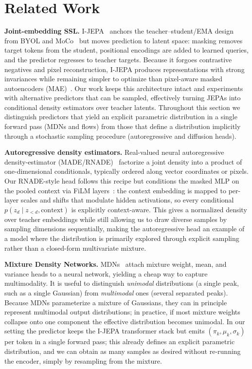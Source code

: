 \documentclass[conference]{IEEEtran}
\begin{document}
\section{Related Work}
\textbf{Joint-embedding SSL.}
I-JEPA~\cite{assran2023jepa} anchors the teacher--student/EMA design from BYOL and MoCo~\cite{grill2020byol,chen2020moco,chen2020momentum} but moves prediction to latent space: masking removes target tokens from the student, positional encodings are added to learned queries, and the predictor regresses to teacher targets.
Because it forgoes contrastive negatives and pixel reconstruction, I-JEPA produces representations with strong invariances while remaining simpler to optimize than pixel-aware masked autoencoders (MAE)~\cite{he2022mae}.
Our work keeps this architecture intact and experiments with alternative predictors that can be sampled, effectively turning JEPAs into conditional density estimators over teacher latents.
Throughout this section we distinguish predictors that yield an explicit parametric distribution in a single forward pass (MDNs and flows) from those that define a distribution implicitly through a stochastic sampling procedure (autoregressive and diffusion heads).

\textbf{Autoregressive density estimators.}
Real-valued neural autoregressive density-estimator (MADE/RNADE)~\cite{germain2015made,uria2013rnade} factorize a joint density into a product of one-dimensional conditionals, typically ordered along vector coordinates or pixels.
Our RNADE-style head follows this recipe but conditions the masked MLP on the pooled context via FiLM layers~\cite{perez2018film}: the context embedding is mapped to per-layer scales and shifts that modulate hidden activations, so every conditional $p(z_d \mid z_{<d}, \text{context})$ is explicitly context-aware.
This gives a normalized density over teacher embeddings while still allowing us to draw diverse samples by sampling dimensions sequentially, making the autoregressive head an example of a model where the distribution is primarily explored through explicit sampling rather than a closed-form multivariate mixture.

\textbf{Mixture Density Networks.}
MDNs~\cite{bishop1994mdn} attach mixture weight, mean, and variance heads to a neural network, yielding a cheap way to capture multimodality.
It is useful to distinguish \emph{unimodal} distributions (a single peak, such as a single Gaussian) from \emph{multimodal} ones (several separated peaks).
Because MDNs parameterize a mixture of Gaussians, they can in principle represent multimodal output distributions; in practice, if most mixture weights collapse onto one component the effective distribution becomes unimodal.
In our setting the predictor keeps the I-JEPA transformer stack but emits $(\pi_k,\mu_k,\sigma_k)$ per token in a single forward pass; this already defines an explicit parametric distribution, and we can obtain as many samples as desired without re-running the encoder, simply by resampling from the mixture.
\end{document}
